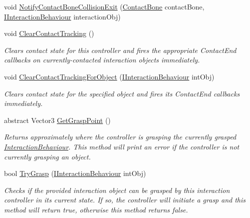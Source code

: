 \begin{DoxyCompactItemize}
void \mbox{\hyperlink{class_leap_1_1_unity_1_1_interaction_1_1_interaction_controller_a9bae79d10f8020e2f1179042f93e1f3c}{Notify\+Contact\+Bone\+Collision\+Exit}} (\mbox{\hyperlink{class_leap_1_1_unity_1_1_interaction_1_1_contact_bone}{Contact\+Bone}} contact\+Bone, \mbox{\hyperlink{interface_leap_1_1_unity_1_1_interaction_1_1_i_interaction_behaviour}{I\+Interaction\+Behaviour}} interaction\+Obj)
\item 
void \mbox{\hyperlink{class_leap_1_1_unity_1_1_interaction_1_1_interaction_controller_a9496bf1f9d82ea3a027b2bdf630df4e5}{Clear\+Contact\+Tracking}} ()
\begin{DoxyCompactList}\small\item\em Clears contact state for this controller and fires the appropriate Contact\+End callbacks on currently-\/contacted interaction objects immediately. \end{DoxyCompactList}\item 
void \mbox{\hyperlink{class_leap_1_1_unity_1_1_interaction_1_1_interaction_controller_a5dd3dbbc1e54365599aa7f8890be5ca0}{Clear\+Contact\+Tracking\+For\+Object}} (\mbox{\hyperlink{interface_leap_1_1_unity_1_1_interaction_1_1_i_interaction_behaviour}{I\+Interaction\+Behaviour}} int\+Obj)
\begin{DoxyCompactList}\small\item\em Clears contact state for the specified object and fires its Contact\+End callbacks immediately. \end{DoxyCompactList}\item 
abstract Vector3 \mbox{\hyperlink{class_leap_1_1_unity_1_1_interaction_1_1_interaction_controller_aca84a24dd5f2f73a7c8bee6a15cea0a4}{Get\+Grasp\+Point}} ()
\begin{DoxyCompactList}\small\item\em Returns approximately where the controller is grasping the currently grasped \mbox{\hyperlink{class_leap_1_1_unity_1_1_interaction_1_1_interaction_behaviour}{Interaction\+Behaviour}}. This method will print an error if the controller is not currently grasping an object. \end{DoxyCompactList}\item 
bool \mbox{\hyperlink{class_leap_1_1_unity_1_1_interaction_1_1_interaction_controller_a45ba36ef191ab50b94feba99fcc8c05d}{Try\+Grasp}} (\mbox{\hyperlink{interface_leap_1_1_unity_1_1_interaction_1_1_i_interaction_behaviour}{I\+Interaction\+Behaviour}} int\+Obj)
\begin{DoxyCompactList}\small\item\em Checks if the provided interaction object can be grasped by this interaction controller in its current state. If so, the controller will initiate a grasp and this method will return true, otherwise this method returns false. \end{DoxyCompactList}\item 

\end{DoxyCompactItemize}
